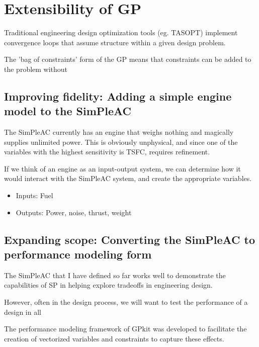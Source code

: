 \chapter{Extensibility of \gls{GP}}

Traditional engineering design optimization tools (eg. TASOPT) implement convergence loops that assume structure within a given design problem. 

The 'bag of constraints' form of the GP means that constraints can be added to the problem without 

\section{Improving fidelity: Adding a simple engine model to the SimPleAC}

The SimPleAC currently has an engine that weighs nothing and magically supplies unlimited power. This is obviously unphysical, and since one of the variables with the highest sensitivity is TSFC, requires refinement. 

If we think of an engine as an input-output system, we can determine how it would interact with the SimPleAC system, and create the appropriate variables. 

\begin{itemize}
\item Inputs: Fuel
\item Outputs: Power, noise, thrust, weight
\end{itemize}

\section{Expanding scope: Converting the SimPleAC to performance modeling form}

The SimPleAC that I have defined so far works well to demonstrate the capabilities of \gls{SP} in helping explore tradeoffs in engineering design. 

However, often in the design process, we will want to test the performance of a design in all

The performance modeling framework of GPkit was developed to facilitate the creation of vectorized variables and constraints to capture these effects. 
